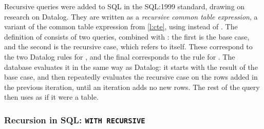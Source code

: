 Recursive queries were added to SQL in the SQL:1999 standard, drawing on research on Datalog.
They are written as a \emph{recursive common table expression}, a variant of the common table expression from \autoref{l:cte}, using  instead of .
The definition of  consists of two  queries, combined with : the first is the base case, and the second is the recursive case, which refers to  itself.
These correspond to the two Datalog rules for , and the final  corresponds to the rule for .
The database evaluates it in the same way as Datalog: it starts with the result of the base case, and then repeatedly evaluates the recursive case on the rows added in the previous iteration, until an iteration adds no new rows.
The rest of the query then uses  as if it were a table.

\begin{frame}
    \label{s:with-recursive}
    \frametitle{Recursion in SQL: \texttt{WITH RECURSIVE}}
    \pause
    \equivalentdivider
    \inputminted[fontsize=\footnotesize]{sql}{code/datalog-cambs.sql}
\end{frame}
\label{l:with-recursive}

